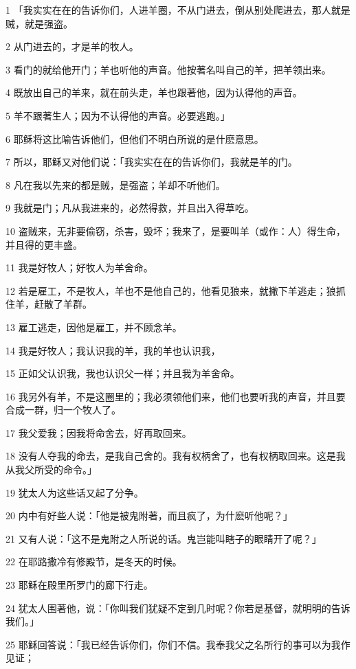 \par 1 「我实实在在的告诉你们，人进羊圈，不从门进去，倒从别处爬进去，那人就是贼，就是强盗。
\par 2 从门进去的，才是羊的牧人。
\par 3 看门的就给他开门；羊也听他的声音。他按著名叫自己的羊，把羊领出来。
\par 4 既放出自己的羊来，就在前头走，羊也跟著他，因为认得他的声音。
\par 5 羊不跟著生人；因为不认得他的声音。必要逃跑。」
\par 6 耶稣将这比喻告诉他们，但他们不明白所说的是什麽意思。
\par 7 所以，耶稣又对他们说：「我实实在在的告诉你们，我就是羊的门。
\par 8 凡在我以先来的都是贼，是强盗；羊却不听他们。
\par 9 我就是门；凡从我进来的，必然得救，并且出入得草吃。
\par 10 盗贼来，无非要偷窃，杀害，毁坏；我来了，是要叫羊（或作：人）得生命，并且得的更丰盛。
\par 11 我是好牧人；好牧人为羊舍命。
\par 12 若是雇工，不是牧人，羊也不是他自己的，他看见狼来，就撇下羊逃走；狼抓住羊，赶散了羊群。
\par 13 雇工逃走，因他是雇工，并不顾念羊。
\par 14 我是好牧人；我认识我的羊，我的羊也认识我，
\par 15 正如父认识我，我也认识父一样；并且我为羊舍命。
\par 16 我另外有羊，不是这圈里的；我必须领他们来，他们也要听我的声音，并且要合成一群，归一个牧人了。
\par 17 我父爱我；因我将命舍去，好再取回来。
\par 18 没有人夺我的命去，是我自己舍的。我有权柄舍了，也有权柄取回来。这是我从我父所受的命令。」
\par 19 犹太人为这些话又起了分争。
\par 20 内中有好些人说：「他是被鬼附著，而且疯了，为什麽听他呢？」
\par 21 又有人说：「这不是鬼附之人所说的话。鬼岂能叫瞎子的眼睛开了呢？」
\par 22 在耶路撒冷有修殿节，是冬天的时候。
\par 23 耶稣在殿里所罗门的廊下行走。
\par 24 犹太人围著他，说：「你叫我们犹疑不定到几时呢？你若是基督，就明明的告诉我们。」
\par 25 耶稣回答说：「我已经告诉你们，你们不信。我奉我父之名所行的事可以为我作见证；
